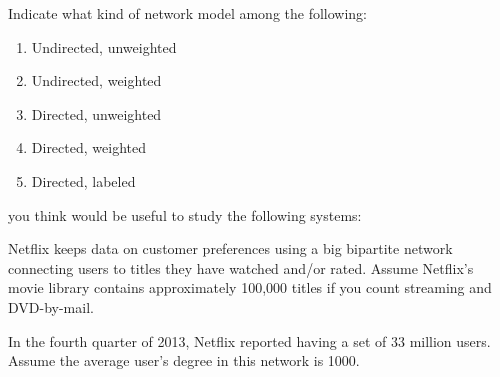 \documentclass[11pt]{exam}
\begin{document}
\begin{questions}


Indicate what kind of network model among the following:
\begin{enumerate}
\item Undirected, unweighted
\item Undirected, weighted
\item Directed, unweighted
\item Directed, weighted
\item Directed, labeled
\end{enumerate}
you think would be useful to study the following systems:


Netflix keeps data on customer preferences using a big bipartite network connecting users to titles they have watched and/or rated. Assume Netflix's movie library contains approximately 100,000 titles if you count streaming and DVD-by-mail.

In the fourth quarter of 2013, Netflix reported having a set of 33 million users. Assume the average user's degree in this network is 1000.



\end{questions}
\end{document}
